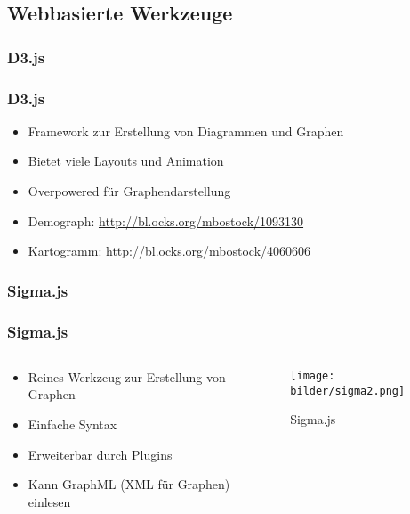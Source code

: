 \subsection{Webbasierte Werkzeuge}
\subsubsection{D3.js}
\begin{frame}
	\frametitle{D3.js}
	\begin{itemize}
		\item Framework zur Erstellung von Diagrammen und Graphen
		\item Bietet viele Layouts und Animation
		\item Overpowered für Graphendarstellung
		\item Demograph: \url{http://bl.ocks.org/mbostock/1093130}
		\item Kartogramm: \url{http://bl.ocks.org/mbostock/4060606}
	\end{itemize}
\end{frame}
\subsubsection{Sigma.js}
\begin{frame}
	\frametitle{Sigma.js}
	\begin{columns}
	\begin{column}{0.49\textwidth}
	\begin{itemize}
		\item Reines Werkzeug zur Erstellung von Graphen
		\item Einfache Syntax
		\item Erweiterbar durch Plugins
		\item Kann GraphML (XML für Graphen) einlesen
	\end{itemize}
	\end{column}
	\begin{column}{0.49\textwidth}
	\begin{figure}[h!]
		\centering
		\texttt{[image: bilder/sigma2.png]}
		\caption{Sigma.js}
		\label{fig:sigma}
	\end{figure}
	\end{column}
	\end{columns}

\end{frame}
